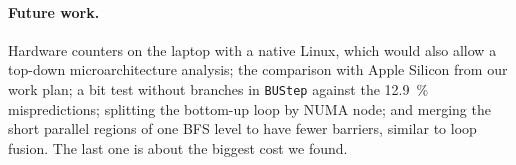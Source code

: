 \paragraph{Future work.} Hardware counters on the laptop with a native Linux, which would also
allow a top-down microarchitecture analysis; the comparison with Apple Silicon from our work
plan; a bit test without branches in \texttt{BUStep} against the \SI{12.9}{\percent}
mispredictions; splitting the bottom-up loop by NUMA node; and merging the short parallel
regions of one BFS level to have fewer barriers, similar to loop fusion. The last one is about
the biggest cost we found.
